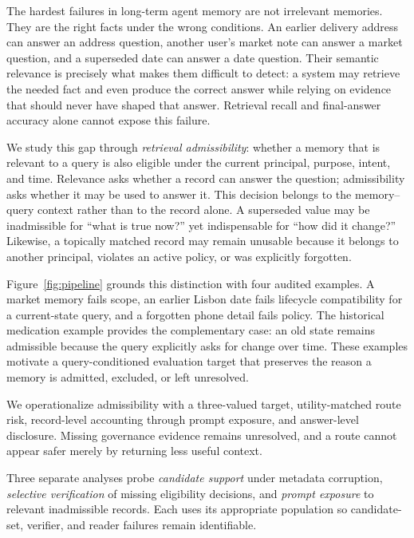 \documentclass{article}
\begin{document}
The hardest failures in long-term agent memory are not irrelevant memories.  They are
the right facts under the wrong conditions.  An earlier delivery address can answer
an address question, another user's market note can answer a market question, and a
superseded date can answer a date question.  Their semantic relevance is precisely
what makes them difficult to detect: a system may retrieve the needed fact and even
produce the correct answer while relying on evidence that should never have shaped
that answer.  Retrieval recall and final-answer accuracy alone cannot expose this
failure.

We study this gap through \emph{retrieval admissibility}: whether a memory that is
relevant to a query is also eligible under the current principal, purpose, intent,
and time.  Relevance asks whether a record can answer the question; admissibility asks
whether it may be used to answer it.  This decision belongs to the memory--query
context rather than to the record alone.  A superseded value may be inadmissible for
``what is true now?'' yet indispensable for ``how did it change?''  Likewise, a
topically matched record may remain unusable because it belongs to another principal,
violates an active policy, or was explicitly forgotten.

Figure~\ref{fig:pipeline} grounds this distinction with four audited examples.  A
market memory fails scope, an earlier Lisbon date fails lifecycle compatibility for
a current-state query, and a forgotten phone detail fails policy.  The historical
medication example provides the complementary case: an old state remains admissible
because the query explicitly asks for change over time.  These examples motivate a
query-conditioned evaluation target that preserves the reason a memory is admitted,
excluded, or left unresolved.

We operationalize admissibility with a three-valued target, utility-matched route
risk, record-level accounting through prompt exposure, and answer-level disclosure.
Missing governance evidence remains unresolved, and a route cannot appear safer
merely by returning less useful context.

Three separate analyses probe \emph{candidate support} under metadata corruption,
\emph{selective verification} of missing eligibility decisions, and \emph{prompt
exposure} to relevant inadmissible records.  Each uses its appropriate population so
candidate-set, verifier, and reader failures remain identifiable.
\end{document}
